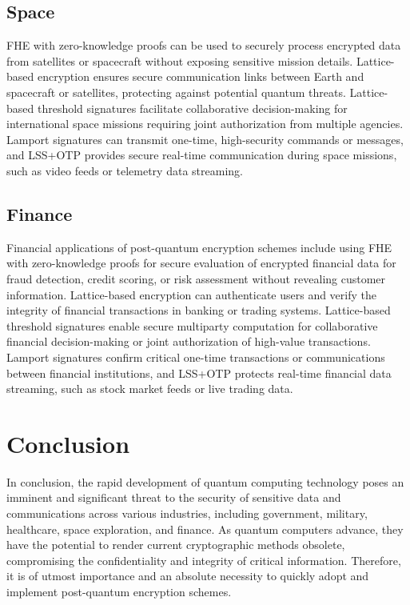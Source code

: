 \documentclass[11pt]{article}
\begin{document}
\subsection{Space}

FHE with zero-knowledge proofs can be used to securely process encrypted data from satellites or spacecraft without exposing sensitive mission details. Lattice-based encryption ensures secure communication links between Earth and spacecraft or satellites, protecting against potential quantum threats. Lattice-based threshold signatures facilitate collaborative decision-making for international space missions requiring joint authorization from multiple agencies. Lamport signatures can transmit one-time, high-security commands or messages, and LSS+OTP provides secure real-time communication during space missions, such as video feeds or telemetry data streaming.


\subsection{Finance}

Financial applications of post-quantum encryption schemes include using FHE with zero-knowledge proofs for secure evaluation of encrypted financial data for fraud detection, credit scoring, or risk assessment without revealing customer information. Lattice-based encryption can authenticate users and verify the integrity of financial transactions in banking or trading systems. Lattice-based threshold signatures enable secure multiparty computation for collaborative financial decision-making or joint authorization of high-value transactions. Lamport signatures confirm critical one-time transactions or communications between financial institutions, and LSS+OTP protects real-time financial data streaming, such as stock market feeds or live trading data.


\section{Conclusion}

In conclusion, the rapid development of quantum computing technology poses an imminent and significant threat to the security of sensitive data and communications across various industries, including government, military, healthcare, space exploration, and finance. As quantum computers advance, they have the potential to render current cryptographic methods obsolete, compromising the confidentiality and integrity of critical information. Therefore, it is of utmost importance and an absolute necessity to quickly adopt and implement post-quantum encryption schemes.
\end{document}
